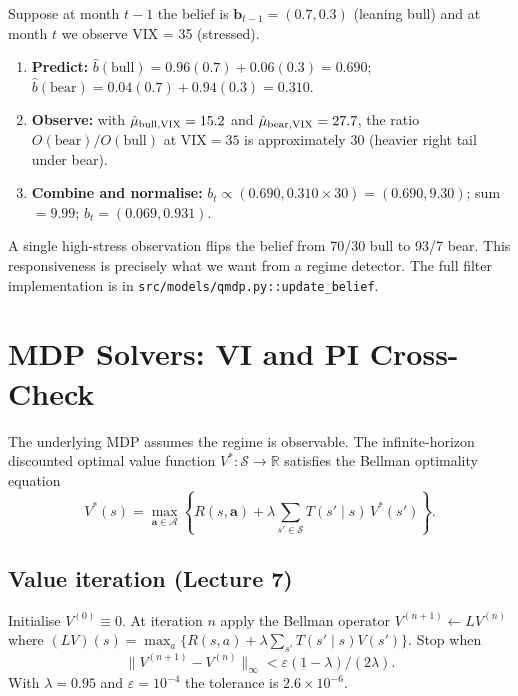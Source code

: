 \documentclass[11pt]{article}
\theoremstyle{plain1}
\theoremstyle{definition1}
\newcommand{\R}{\mathbb{R}}
\newcommand{\1}{\mathbf{1}}
\newcommand{\bel}{\mathbf{b}}
\newcommand{\state}{\mathcal{S}}
\newcommand{\action}{\mathcal{A}}
\begin{document}
Suppose at month $t{-}1$ the belief is $\bel_{t-1} = (0.7, 0.3)$ (leaning bull) and at month $t$ we observe VIX = 35 (stressed).
\begin{enumerate}[leftmargin=2em]
  \item \textbf{Predict:} $\hat b(\text{bull}) = 0.96(0.7) + 0.06(0.3) = 0.690$;\quad $\hat b(\text{bear}) = 0.04(0.7) + 0.94(0.3) = 0.310$.
  \item \textbf{Observe:} with $\hat\mu_{\rm bull,VIX} = 15.2$ and $\hat\mu_{\rm bear,VIX} = 27.7$, the ratio $O(\text{bear})/O(\text{bull})$ at VIX$=35$ is approximately $30$ (heavier right tail under bear).
  \item \textbf{Combine and normalise:} $b_t \propto (0.690, 0.310 \times 30) = (0.690, 9.30)$; sum $= 9.99$; $b_t = (0.069, 0.931)$.
\end{enumerate}
A single high-stress observation flips the belief from 70/30 bull to 93/7 bear. This responsiveness is precisely what we want from a regime detector. The full filter implementation is in \texttt{src/models/qmdp.py::update\_belief}.

\section{MDP Solvers: VI and PI Cross-Check}\label{sec:vi-pi}

The underlying MDP assumes the regime is observable. The infinite-horizon discounted optimal value function $V^\ast: \state \to \R$ satisfies the Bellman optimality equation
\begin{equation}\label{eq:bellman}
V^\ast(s) = \max_{\mathbf{a} \in \action}\!\left\{ R(s, \mathbf{a}) + \lambda \sum_{s' \in \state} T(s' \mid s)\, V^\ast(s') \right\}.
\end{equation}

\subsection{Value iteration (Lecture 7)}

Initialise $V^{(0)} \equiv 0$. At iteration $n$ apply the Bellman operator $V^{(n+1)} \leftarrow LV^{(n)}$ where $(LV)(s) = \max_a \{R(s,a) + \lambda \sum_{s'} T(s' \mid s) V(s')\}$. Stop when
\[
\|V^{(n+1)} - V^{(n)}\|_\infty < \varepsilon(1 - \lambda) / (2\lambda).
\]
With $\lambda = 0.95$ and $\varepsilon = 10^{-4}$ the tolerance is $2.6 \times 10^{-6}$.
\end{document}
